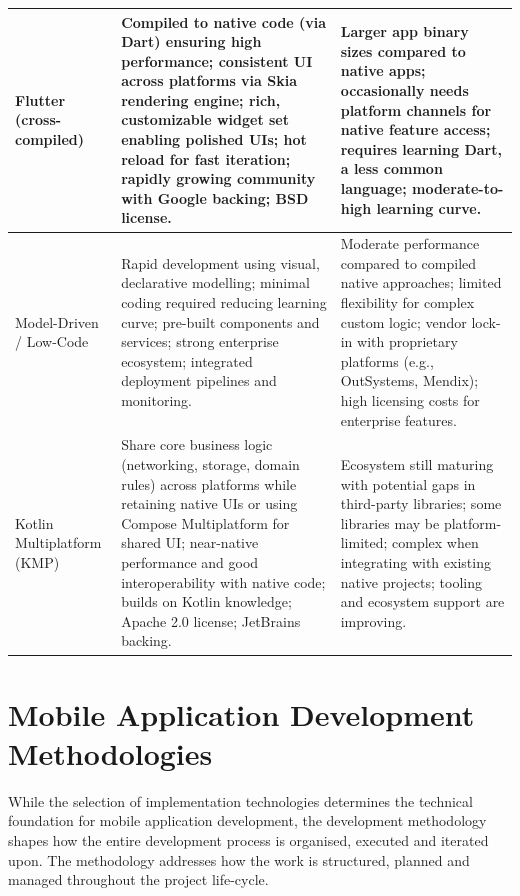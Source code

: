 \begin{table}[ht]
\begin{tabularx}{\textwidth}{|p{3.2cm}|X|X|}
		Flutter (cross-compiled) & 
		Compiled to native code (via Dart) ensuring high performance; consistent UI across platforms via Skia rendering engine; rich, customizable widget set enabling polished UIs; hot reload for fast iteration; rapidly growing community with Google backing; BSD license. & 
		Larger app binary sizes compared to native apps; occasionally needs platform channels for native feature access; requires learning Dart, a less common language; moderate-to-high learning curve. \\ \hline
		
		Model-Driven / Low-Code & 
		Rapid development using visual, declarative modelling; minimal coding required reducing learning curve; pre-built components and services; strong enterprise ecosystem; integrated deployment pipelines and monitoring. & 
		Moderate performance compared to compiled native approaches; limited flexibility for complex custom logic; vendor lock-in with proprietary platforms (e.g., OutSystems, Mendix); high licensing costs for enterprise features. \\ \hline
		
		Kotlin Multiplatform (KMP) & 
		Share core business logic (networking, storage, domain rules) across platforms while retaining native UIs or using Compose Multiplatform for shared UI; near-native performance and good interoperability with native code; builds on Kotlin knowledge; Apache 2.0 license; JetBrains backing. & 
		Ecosystem still maturing with potential gaps in third-party libraries; some libraries may be platform-limited; complex when integrating with existing native projects; tooling and ecosystem support are improving. \\ \hline
		
		
	\end{tabularx}
\end{table}



\section{Mobile Application Development Methodologies}\label{sec:app-dev-meth}

While the selection of implementation technologies determines the technical foundation for mobile application development, the development methodology shapes how the entire development process is organised, executed and iterated upon. The methodology addresses how the work is structured, planned and managed throughout the project life-cycle.


